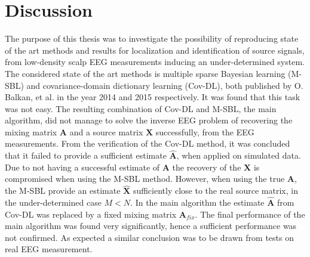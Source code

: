 \chapter{Discussion}
The purpose of this thesis was to investigate the possibility of reproducing state of the art methods and results for localization and identification of source signals, from low-density scalp EEG measurements inducing an under-determined system.
The considered state of the art methods is multiple sparse Bayesian learning (M-SBL)\cite{Balkan2014} and covariance-domain dictionary learning (Cov-DL)\cite{Balkan2015}, both published by O. Balkan, et al. in the year 2014 and 2015 respectively. 
It was found that this task was not easy. The resulting combination of Cov-DL and M-SBL, the main algorithm, did not manage to solve the inverse EEG problem of recovering the mixing matrix $\textbf{A}$ and a source matrix $\textbf{X}$ successfully, from the EEG measurements. 
From the verification of the Cov-DL method, it was concluded that it failed to provide a sufficient estimate $\hat{\mathbf{A}}$, when applied on simulated data. 
Due to not having a successful estimate of $\textbf{A}$ the recovery of the $\textbf{X}$ is compromised when using the M-SBL method.
However, when using the true $\mathbf{A}$, the M-SBL provide an estimate $\hat{\mathbf{X}}$ sufficiently close to the real source matrix, in the under-determined case $M<N$. 
In the main algorithm the estimate $\hat{\textbf{A}}$ from Cov-DL was replaced by a fixed mixing matrix $\textbf{A}_{fix}$. The final performance of the main algorithm was found very significantly, hence a sufficient performance was not confirmed. As expected a similar conclusion was to be drawn from tests on real EEG measurement. 

